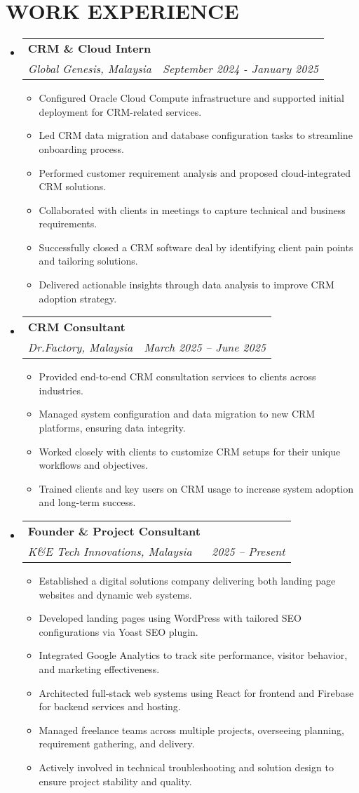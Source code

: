 \documentclass[letterpaper,11pt]{article}
\makeatletter
\newcommand{\resumeItem}[1]{
  \item\small{
    {#1 \vspace{-1pt}}
  }
}
\newcommand{\resumeSubheading}[4]{
  \vspace{-2pt}\item
    \begin{tabular*}{1.0\textwidth}[t]{l@{\extracolsep{\fill}}r}
      \textbf{\large#1} & \textbf{\small #2} \\
      \textit{\large#3} & \textit{\small #4} \\
      
    \end{tabular*}\vspace{-7pt}
}
\newcommand{\resumeSubHeadingListStart}{\begin{itemize}[leftmargin=0.0in, label={}]}
\newcommand{\resumeSubHeadingListEnd}{\end{itemize}}
\newcommand{\resumeItemListStart}{\begin{itemize}[leftmargin=0.1in]}
\newcommand{\resumeItemListEnd}{\end{itemize}\vspace{-5pt}}
\makeatother
\begin{document}
\section{\color{airforceblue}WORK EXPERIENCE}
  \resumeSubHeadingListStart

    \resumeSubheading
      {CRM \& Cloud Intern}{} 
      {Global Genesis, Malaysia}{September 2024 - January 2025}
      \resumeItemListStart
        \resumeItem{Configured Oracle Cloud Compute infrastructure and supported initial deployment for CRM-related services.}
        \resumeItem{Led CRM data migration and database configuration tasks to streamline onboarding process.}
        \resumeItem{Performed customer requirement analysis and proposed cloud-integrated CRM solutions.}
        \resumeItem{Collaborated with clients in meetings to capture technical and business requirements.}
        \resumeItem{Successfully closed a CRM software deal by identifying client pain points and tailoring solutions.}
        \resumeItem{Delivered actionable insights through data analysis to improve CRM adoption strategy.}
      \resumeItemListEnd  
    
    \resumeSubheading
      {CRM Consultant}{} 
      {Dr.Factory, Malaysia}{March 2025 – June 2025}
      \resumeItemListStart
        \resumeItem{Provided end-to-end CRM consultation services to clients across industries.}
        \resumeItem{Managed system configuration and data migration to new CRM platforms, ensuring data integrity.}
        \resumeItem{Worked closely with clients to customize CRM setups for their unique workflows and objectives.}
        \resumeItem{Trained clients and key users on CRM usage to increase system adoption and long-term success.}
      \resumeItemListEnd  
    
    \resumeSubheading
      {Founder \& Project Consultant}{} 
      {K\&E Tech Innovations, Malaysia}{2025 – Present}
      \resumeItemListStart
        \resumeItem{Established a digital solutions company delivering both landing page websites and dynamic web systems.}
        \resumeItem{Developed landing pages using WordPress with tailored SEO configurations via Yoast SEO plugin.}
        \resumeItem{Integrated Google Analytics to track site performance, visitor behavior, and marketing effectiveness.}
        \resumeItem{Architected full-stack web systems using React for frontend and Firebase for backend services and hosting.}
        \resumeItem{Managed freelance teams across multiple projects, overseeing planning, requirement gathering, and delivery.}
        \resumeItem{Actively involved in technical troubleshooting and solution design to ensure project stability and quality.}
      \resumeItemListEnd  
  \resumeSubHeadingListEnd
\vspace{-12pt}
\end{document}
